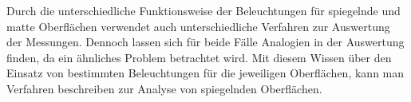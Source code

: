 \p
Durch die unterschiedliche Funktionsweise der Beleuchtungen für spiegelnde und matte Oberflächen verwendet auch unterschiedliche Verfahren zur Auswertung der Messungen.
Dennoch lassen sich für beide Fälle Analogien in der Auswertung finden, da ein ähnliches Problem betrachtet wird.
Mit diesem Wissen über den Einsatz von bestimmten Beleuchtungen für die jeweiligen Oberflächen, kann man Verfahren beschreiben zur Analyse von spiegelnden Oberflächen.